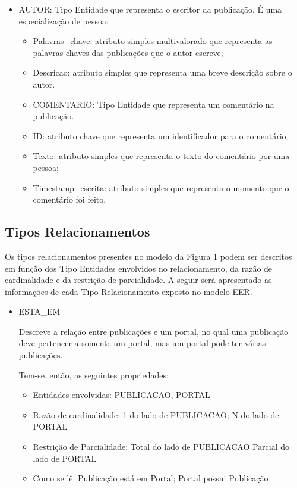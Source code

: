 \begin{itemize}
\item AUTOR: Tipo Entidade que representa o escritor da publicação. É uma especialização de pessoa;
				\begin{itemize}
\item Palavras\_chave: atributo simples multivalorado que representa as palavras chaves das publicações que o autor escreve;
\item Descricao: atributo simples que representa uma breve descrição sobre o autor.
\item COMENTARIO: Tipo Entidade que representa um comentário na publicação.
\item ID: atributo chave que representa um identificador para o comentário;
\item Texto: atributo simples que representa o texto do comentário por uma pessoa;
\item Timestamp\_escrita: atributo simples que representa o momento que o comentário foi feito.
				\end{itemize}
				\end{itemize}
\subsection{Tipos Relacionamentos}

Os tipos relacionamentos presentes no modelo da Figura 1 podem ser descritos em função dos Tipo Entidades envolvidos no relacionamento, da razão de cardinalidade e da restrição de parcialidade. A seguir será apresentado as informações de cada Tipo Relacionamento exposto no modelo EER.

\begin{itemize}
				
\item ESTA\_EM

Descreve a relação entre publicações e um portal, no qual uma publicação deve pertencer a somente um portal, mas um portal pode ter várias publicações.

Tem-se, então, as seguintes propriedades:

\begin{itemize}

\item Entidades envolvidas: PUBLICACAO, PORTAL
\item Razão de cardinalidade: 1 do lado de PUBLICACAO; N do lado de PORTAL
\item Restrição de Parcialidade: Total do lado de PUBLICACAO                        Parcial do lado de PORTAL
\item Como se lê: Publicação está em Portal; Portal possui Publicação
\end{itemize}
\end{itemize}

